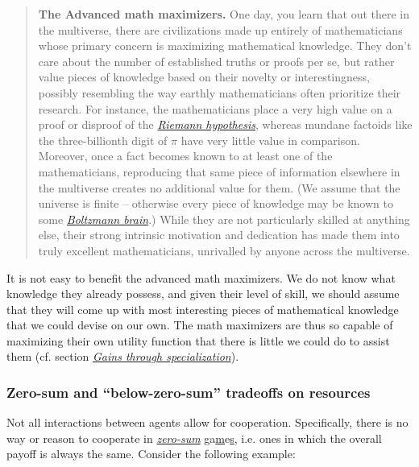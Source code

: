 \begin{quote}
\textbf{The Advanced math maximizers.} One day, you learn that out there
in the multiverse, there are civilizations made up entirely of
mathematicians whose primary concern is maximizing mathematical
knowledge. They don't care about the number of established truths or
proofs per se, but rather value pieces of knowledge based on their
novelty or interestingness, possibly resembling the way earthly
mathematicians often prioritize their research. For instance, the
mathematicians place a very high value on a proof or disproof of the
\href{https://en.wikipedia.org/wiki/Riemann_hypothesis}{\emph{Riemann
hypothesis}}, whereas mundane factoids like the three-billionth digit of
\(\pi\) have very little value in comparison. Moreover, once a fact
becomes known to at least one of the mathematicians, reproducing that
same piece of information elsewhere in the multiverse creates no
additional value for them. (We assume that the universe is finite --
otherwise every piece of knowledge may be known to some
\href{https://en.wikipedia.org/wiki/Boltzmann_brain}{\emph{Boltzmann
brain}}.) While they are not particularly skilled at anything else,
their strong intrinsic motivation and dedication has made them into
truly excellent mathematicians, unrivalled by anyone across the
multiverse.
\end{quote}

It is not easy to benefit the advanced math maximizers. We do not know
what knowledge they already possess, and given their level of skill, we
should assume that they will come up with most interesting pieces of
mathematical knowledge that we could devise on our own. The math
maximizers are thus so capable of maximizing their own utility function
that there is little we could do to assist them (cf. section
\protect\hyperlink{gains-through-specialization-and-comparative-advantages}{\emph{Gains
through specialization}}).

\hypertarget{zero-sum-and-below-zero-sum-tradeoffs-on-resources}{\subsubsection{Zero-sum
and ``below-zero-sum'' tradeoffs on
resources}\label{zero-sum-and-below-zero-sum-tradeoffs-on-resources}}

Not all interactions between agents allow for cooperation. Specifically,
there is no way or reason to cooperate in
\href{https://en.wikipedia.org/wiki/Zero-sum_game}{\emph{zero-sum}}
\href{https://en.wikipedia.org/wiki/Zero-sum_game}{g}a\href{https://en.wikipedia.org/wiki/Zero-sum_game}{m}e\href{https://en.wikipedia.org/wiki/Zero-sum_game}{s},
i.e. ones in which the overall payoff is always the same. Consider the
following example:

